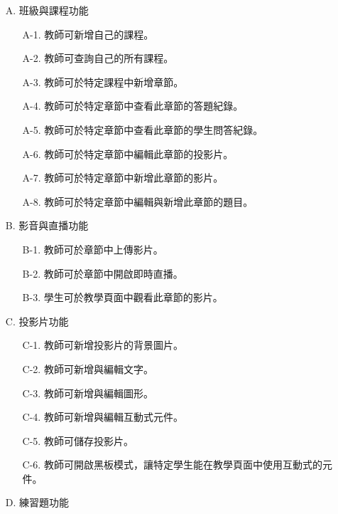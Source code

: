 \documentclass[12pt]{article}
\begin{document}
\begin{enumerate}
\begin{enumerate}
\begin{enumerate}
        \end{enumerate}
        \begin{enumerate}
          \item [A.] 班級與課程功能
            \begin{enumerate}
              \item [A-1.] 教師可新增自己的課程。
              \item [A-2.] 教師可查詢自己的所有課程。
              \item [A-3.] 教師可於特定課程中新增章節。
              \item [A-4.] 教師可於特定章節中查看此章節的答題紀錄。
              \item [A-5.] 教師可於特定章節中查看此章節的學生問答紀錄。
              \item [A-6.] 教師可於特定章節中編輯此章節的投影片。
              \item [A-7.] 教師可於特定章節中新增此章節的影片。
              \item [A-8.] 教師可於特定章節中編輯與新增此章節的題目。
            \end{enumerate}
          \item [B.] 影音與直播功能
            \begin{enumerate}
              \item [B-1.] 教師可於章節中上傳影片。
              \item [B-2.] 教師可於章節中開啟即時直播。
              \item [B-3.] 學生可於教學頁面中觀看此章節的影片。
            \end{enumerate}
          \item [C.] 投影片功能
            \begin{enumerate}
              \item [C-1.] 教師可新增投影片的背景圖片。
              \item [C-2.] 教師可新增與編輯文字。
              \item [C-3.] 教師可新增與編輯圖形。
              \item [C-4.] 教師可新增與編輯互動式元件。
              \item [C-5.] 教師可儲存投影片。
              \item [C-6.] 教師可開啟黑板模式，讓特定學生能在教學頁面中使用互動式的元件。
            \end{enumerate}
          \item [D.] 練習題功能
            \begin{enumerate}

\end{enumerate}
\end{enumerate}
\end{enumerate}
\end{enumerate}
\end{document}
